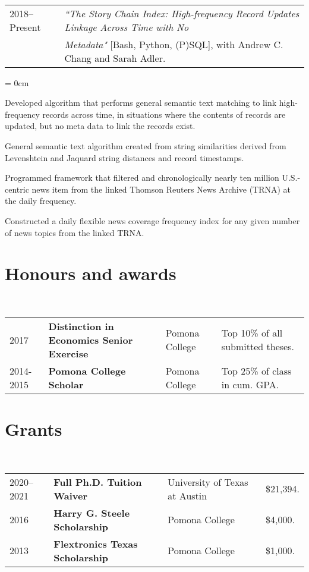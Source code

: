 \documentclass[a4paper, 11pt]{article}
\begin{document}
      \vspace*{1em}
      
      ~\begin{tabular}{ll}
        2018--Present & \textit{``The Story Chain Index: High-frequency Record Updates Linkage Across Time with No}\\
        & \textit{Metadata"} {[Bash, Python, (P)SQL]}, with Andrew C. Chang and Sarah Adler.
      \end{tabular}
      \begin{compactitem}\parskip = 0cm
        \item Developed algorithm that performs general semantic text matching to link high-frequency records across time, in situations where the contents of records are updated, but no meta data to link the records exist.
        \item General semantic text algorithm created from string similarities derived from Levenshtein and Jaquard string distances and record timestamps.
        \item Programmed framework that filtered and chronologically nearly ten million U.S.-centric news item from the linked Thomson Reuters News Archive (TRNA) at the daily frequency.
        \item Constructed a daily flexible news coverage frequency index for any given number of news topics from the linked TRNA.
      \end{compactitem}
      
    \section{Honours and awards}
      ~\begin{tabular}{llll}
        2017 & \textbf{Distinction in Economics Senior Exercise} & Pomona College & Top 10\% of all submitted theses.\\
        2014-2015 & \textbf{Pomona College Scholar} & Pomona College & Top 25\% of class in cum. GPA.\\
      \end{tabular}
      
    \section{Grants}
      ~\begin{tabular}{llll}
        2020--2021 & \textbf{Full Ph.D. Tuition Waiver} & University of Texas at Austin & \$21,394. \\
        2016 & \textbf{Harry G. Steele Scholarship} & Pomona College & \$4,000.\\
        2013 & \textbf{Flextronics Texas Scholarship} & Pomona College & \$1,000.
      \end{tabular}
      
\end{document}
